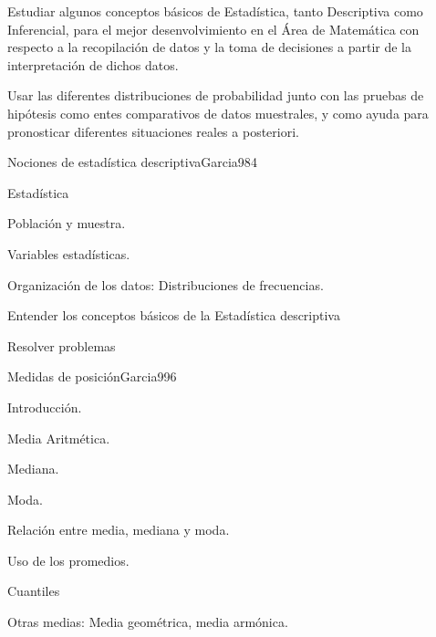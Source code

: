 \begin{syllabus}


\begin{goals}
\item  Estudiar algunos conceptos básicos de Estadística, tanto Descriptiva como Inferencial, para el mejor desenvolvimiento en el Área de Matemática con respecto a la recopilación de datos y la toma de decisiones a partir de la interpretación de dichos datos.
\item  Usar las diferentes distribuciones de probabilidad junto con las pruebas de hipótesis como entes comparativos de datos muestrales, y como ayuda para pronosticar diferentes situaciones reales a posteriori.
\end{goals}

\begin{outcomes}
\end{outcomes}

\begin{unit}{Nociones de estadística descriptiva}{Garcia98}{4}
   \begin{topics}
         \item  Estadística
	 \item  Población y muestra.
	 \item  Variables estadísticas.
         \item  Organización de los datos: Distribuciones de frecuencias.
   \end{topics}

   \begin{learningoutcomes}
         \item  Entender los conceptos básicos de la Estadística descriptiva
         \item  Resolver problemas
   \end{learningoutcomes}
\end{unit}

\begin{unit}{Medidas de posición}{Garcia99}{6}
   \begin{topics}
	\item Introducción.
	\item Media Aritmética.
	\item Mediana.
	\item Moda.
	\item Relación entre media, mediana y moda.
	\item Uso de los promedios.
	\item Cuantiles
	\item Otras medias: Media geométrica, media armónica.
   \end{topics}


\end{unit}
\end{syllabus}
